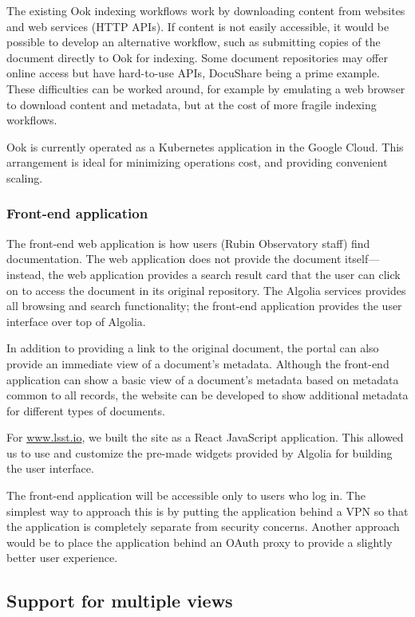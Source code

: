 The existing Ook indexing workflows work by downloading content from websites and web services (HTTP APIs).
If content is not easily accessible, it would be possible to develop an alternative workflow, such as submitting copies of the document directly to Ook for indexing.
Some document repositories may offer online access but have hard-to-use APIs, DocuShare being a prime example.
These difficulties can be worked around, for example by emulating a web browser to download content and metadata, but at the cost of more fragile indexing workflows.

Ook is currently operated as a Kubernetes application in the Google Cloud.
This arrangement is ideal for minimizing operations cost, and providing convenient scaling.

\subsubsection{Front-end application}

The front-end web application is how users (Rubin Observatory staff) find documentation.
The web application does not provide the document itself—instead, the web application provides a search result card that the user can click on to access the document in its original repository.
The Algolia services provides all browsing and search functionality; the front-end application provides the user interface over top of Algolia.

In addition to providing a link to the original document, the portal can also provide an immediate view of a document's metadata.
Although the front-end application can show a basic view of a document's metadata based on metadata common to all records, the website can be developed to show additional metadata for different types of documents.

For \url{www.lsst.io}, we built the site as a React JavaScript application.
This allowed us to use and customize the pre-made widgets provided by Algolia for building the user interface.

The front-end application will be accessible only to users who log in.
The simplest way to approach this is by putting the application behind a VPN so that the application is completely separate from security concerns.
Another approach would be to place the application behind an OAuth proxy to provide a slightly better user experience.

\subsection{Support for multiple views}

